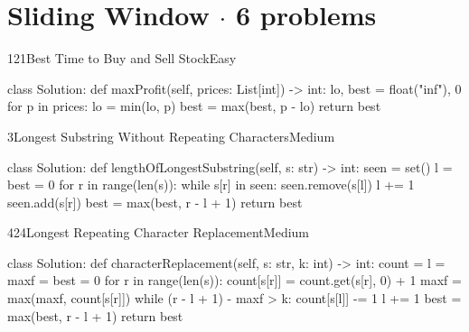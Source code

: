 \section{Sliding Window \texorpdfstring{{\normalsize\color{muted}$\cdot$ 6 problems}}{- 6 problems}}

\begin{problem}{121}{Best Time to Buy and Sell Stock}{Easy}
\begin{code}
class Solution:
    def maxProfit(self, prices: List[int]) -> int:
        lo, best = float("inf"), 0
        for p in prices:
            lo = min(lo, p)
            best = max(best, p - lo)
        return best
\end{code}
\end{problem}

\begin{problem}{3}{Longest Substring Without Repeating Characters}{Medium}
\begin{code}
class Solution:
    def lengthOfLongestSubstring(self, s: str) -> int:
        seen = set()
        l = best = 0
        for r in range(len(s)):
            while s[r] in seen:
                seen.remove(s[l])
                l += 1
            seen.add(s[r])
            best = max(best, r - l + 1)
        return best
\end{code}
\end{problem}

\begin{problem}{424}{Longest Repeating Character Replacement}{Medium}
\begin{code}
class Solution:
    def characterReplacement(self, s: str, k: int) -> int:
        count = {}
        l = maxf = best = 0
        for r in range(len(s)):
            count[s[r]] = count.get(s[r], 0) + 1
            maxf = max(maxf, count[s[r]])
            while (r - l + 1) - maxf > k:
                count[s[l]] -= 1
                l += 1
            best = max(best, r - l + 1)
        return best
\end{code}
\end{problem}

